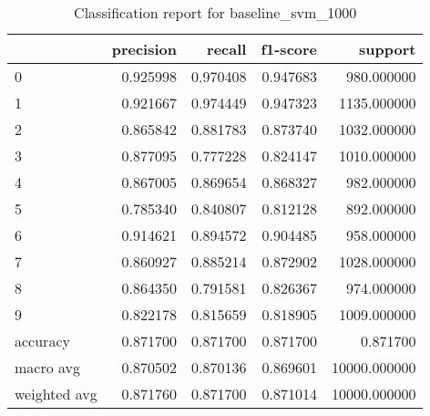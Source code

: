 \begin{table}[htb!]
\centering
\begin{tabular}{lrrrr}
    \toprule
    & precision & recall & f1-score & support \\
    \midrule
    0 & 0.925998 & 0.970408 & 0.947683 & 980.000000 \\
1 & 0.921667 & 0.974449 & 0.947323 & 1135.000000 \\
2 & 0.865842 & 0.881783 & 0.873740 & 1032.000000 \\
3 & 0.877095 & 0.777228 & 0.824147 & 1010.000000 \\
4 & 0.867005 & 0.869654 & 0.868327 & 982.000000 \\
5 & 0.785340 & 0.840807 & 0.812128 & 892.000000 \\
6 & 0.914621 & 0.894572 & 0.904485 & 958.000000 \\
7 & 0.860927 & 0.885214 & 0.872902 & 1028.000000 \\
8 & 0.864350 & 0.791581 & 0.826367 & 974.000000 \\
9 & 0.822178 & 0.815659 & 0.818905 & 1009.000000 \\
accuracy & 0.871700 & 0.871700 & 0.871700 & 0.871700 \\
macro avg & 0.870502 & 0.870136 & 0.869601 & 10000.000000 \\
weighted avg & 0.871760 & 0.871700 & 0.871014 & 10000.000000 \\
\bottomrule
\end{tabular}
\caption{Classification report for baseline\_svm\_1000}
\label{tab:classification-report-baseline_svm_1000}
\end{table}
